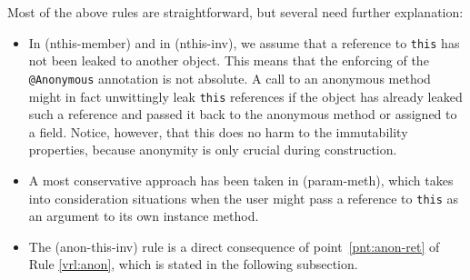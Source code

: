 \documentclass{pracamgr}
\theoremstyle{break}
\theoremstyle{break}
\theoremstyle{break}
\begin{document}
\begin{prooftree}
\end{prooftree}

\begin{prooftree}
\end{prooftree}

\begin{prooftree}
\end{prooftree}

\begin{prooftree}
\end{prooftree}

Most of the above rules are straightforward, but several need further
explanation: 
\begin{itemize}
\item In (nthis-member) and in (nthis-inv), we assume that a reference
  to \texttt{this} has not been leaked to another object. This means
  that the enforcing of the \texttt{@Anonymous} annotation is not
  absolute. A call to an anonymous method might in fact unwittingly
  leak \texttt{this} references if the object has already leaked such
  a reference and passed it back to the anonymous method or assigned
  to a field. Notice, however, that this does no harm to the
  immutability properties, because anonymity is only crucial during
  construction.
\item A most conservative approach has been taken in (param-meth),
  which takes into consideration situations when the user might pass a
  reference to \texttt{this} as an argument to its own instance
  method.
\item The (anon-this-inv) rule is a direct consequence of
  point~\ref{pnt:anon-ret} of Rule \ref{vrl:anon}, which is stated in
  the following subsection.
\end{itemize}
\end{document}
